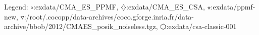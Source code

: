 Legend: {\color{NavyBlue}$\circ$}:exdata/CMA\_ES\_PPMF, {\color{Magenta}$\diamondsuit$}:exdata/CMA\_ES\_CSA, {\color{Orange}$\star$}:exdata/ppmf-new, {\color{CornflowerBlue}$\triangledown$}:/root/.cocopp/data-archives/coco.gforge.inria.fr/data-archive/bbob/2012/CMAES\_posik\_noiseless.tgz, {\color{red}$\varhexagon$}:exdata/csa-classic-001